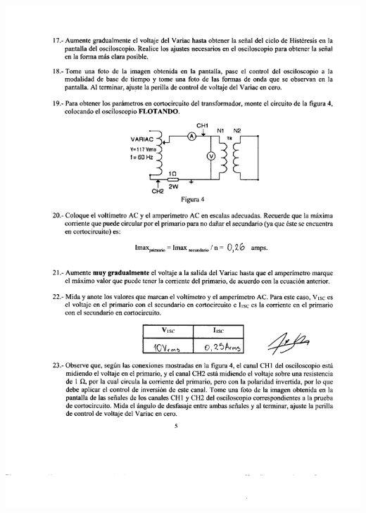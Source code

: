 \documentclass[12pt]{article}
\begin{document}
	\includegraphics[width=16cm,height=21cm]{Img/lab_8_0004}\\
	
	\vspace{3cm}
	
\end{document}
